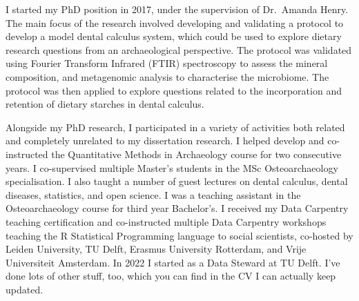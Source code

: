 \documentclass[
  b5paper,
]{book}
\begin{document}
I started my PhD position in 2017, under the supervision of Dr.~Amanda
Henry. The main focus of the research involved developing and validating
a protocol to develop a model dental calculus system, which could be
used to explore dietary research questions from an archaeological
perspective. The protocol was validated using Fourier Transform Infrared
(FTIR) spectroscopy to assess the mineral composition, and metagenomic
analysis to characterise the microbiome. The protocol was then applied
to explore questions related to the incorporation and retention of
dietary starches in dental calculus.

Alongside my PhD research, I participated in a variety of activities
both related and completely unrelated to my dissertation research. I
helped develop and co-instructed the Quantitative Methods in Archaeology
course for two consecutive years. I co-supervised multiple Master's
students in the MSc Osteoarchaeology specialisation. I also taught a
number of guest lectures on dental calculus, dental diseases,
statistics, and open science. I was a teaching assistant in the
Osteoarchaeology course for third year Bachelor's. I received my Data
Carpentry teaching certification and co-instructed multiple Data
Carpentry workshops teaching the R Statistical Programming language to
social scientists, co-hosted by Leiden University, TU Delft, Erasmus
University Rotterdam, and Vrije Universiteit Amsterdam. In 2022 I
started as a Data Steward at TU Delft. I've done lots of other stuff,
too, which you can find in the CV I can actually keep updated.

\label{3ade8a4a-fb1d-4a6c-8409-ac45482d5fc9}

\backmatter
\end{document}
